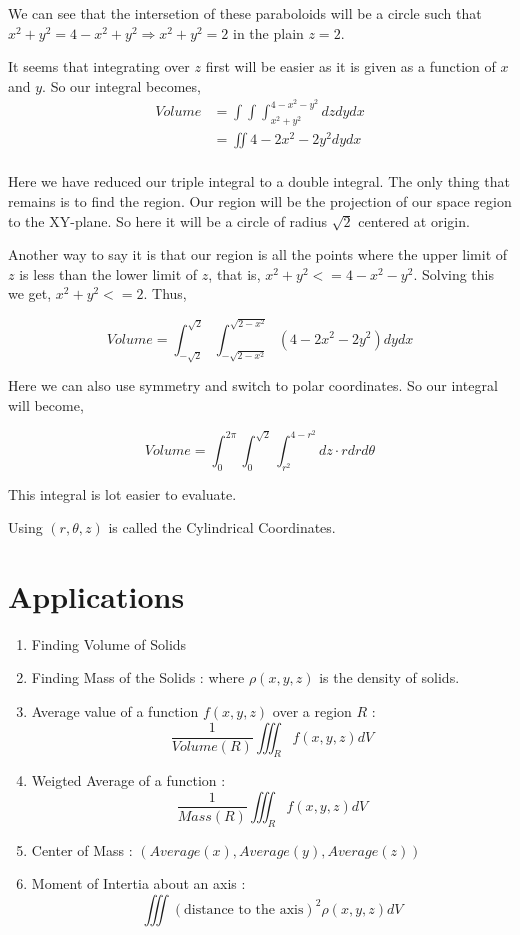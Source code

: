 We can see that the intersetion of these paraboloids will be a circle such that $x^2 + y^2 = 4 - x^2 + y^2 \Rightarrow x^2 + y^2 = 2$ in the plain $z = 2$.

It seems that integrating over $z$ first will be easier as it is given as a function of $x$ and $y$. So our integral becomes,
\begin{align*}
    Volume & = \int \int \int_{x^2+y^2}^{4-x^2-y^2} dz dy dx \\
        & = \iint 4 - 2x^2 -2y^2 dy dx \\
\end{align*}

Here we have reduced our triple integral to a double integral. 
The only thing that remains is to find the region. 
Our region will be the projection of our space region to the XY-plane. 
So here it will be a circle of radius $\sqrt{2}$ centered at origin.


Another way to say it is that our region is all the points where the upper limit of $z$ is less than the lower limit of $z$, that is, $x^2 + y^2 <= 4 - x^2 - y^2$.
Solving this we get, $x^2 + y^2 <= 2$. Thus,

$$
Volume = \int_{-\sqrt{2}}^{\sqrt{2}} \int_{-\sqrt{2-x^2}}^{\sqrt{2-x^2}} (4 - 2x^2 - 2y^2) dy dx
$$

Here we can also use symmetry and switch to polar coordinates. So our integral will become,

$$
Volume = \int_0^{2\pi} \int_0^{\sqrt{2}} \int_{r^2}^{4-r^2} dz \cdot r dr d\theta
$$

This integral is lot easier to evaluate.

Using $(r, \theta, z)$ is called the Cylindrical Coordinates.


\section{Applications}

\begin{enumerate}
    \item Finding Volume of Solids
    \item Finding Mass of the Solids :  where $\rho(x, y, z)$ is the density of solids.
    \item Average value of a function $f(x, y, z)$ over a region $R$ : $$ \frac{1}{Volume(R)} \iiint_R f(x, y, z) dV $$
    \item Weigted Average of a function : $$ \frac{1}{Mass(R)} \iiint_R f(x, y, z) dV $$ 
    \item Center of Mass : $(Average(x), Average(y), Average(z))$
    \item Moment of Intertia about an axis : $$ \iiint (\text{distance to the axis})^2 \rho(x, y, z) dV $$  
\end{enumerate}
